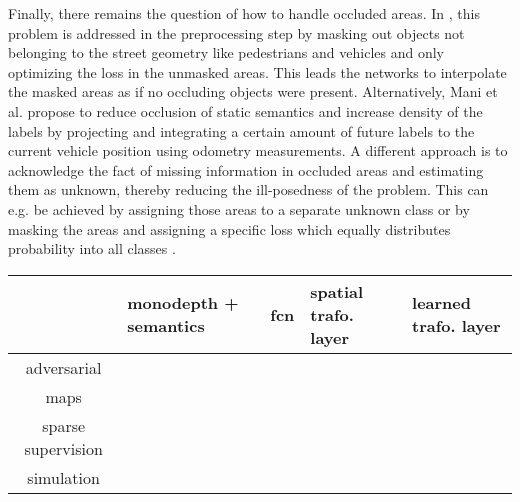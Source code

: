 Finally, there remains the question of how to handle occluded areas. In \cite{schulter2018learning}, this problem is addressed in the preprocessing step by masking out objects not belonging to the street geometry like pedestrians and vehicles and only optimizing the loss in the unmasked areas. This leads the networks to interpolate the masked areas as if no occluding objects were present. Alternatively, Mani et al. propose to reduce occlusion of static semantics and increase density of the labels by projecting and integrating a certain amount of future labels to the current vehicle position using odometry measurements. A different approach is to acknowledge the fact of missing information in occluded areas and estimating them as unknown, thereby reducing the ill-posedness of the problem. This can e.g. be achieved by assigning those areas to a separate unknown class \cite{reiher2020sim2real} or by masking the areas and assigning a specific loss which equally distributes probability into all classes \cite{roddick2020predicting}. 
\begin{center}
	\begin{tabular}{c|m{2.5cm}|m{2.5cm}|m{2.5cm}|m{2.5cm}}
		& monodepth + semantics & \gls{fcn} & spatial trafo. layer & learned trafo. layer\\
		\hline
		adversarial & \cite{schulter2018learning} & \cite{mani2020monolayout} & & \\
		\hline
		maps & \cite{schulter2018learning,philion2020lift} & \cite{mani2020monolayout} & \cite{roddick2020predicting} & \\
		\hline
		sparse supervision &  & \cite{mani2020monolayout,lu2019monocular} &  &\\
		\hline
		simulation &  & \cite{reiher2020sim2real} & \cite{reiher2020sim2real} & \cite{pan2020cross}
	\end{tabular}
\end{center} 
%
